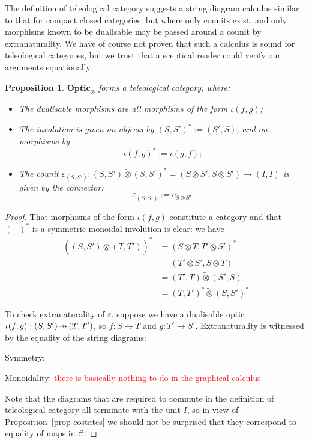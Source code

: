 \documentclass[11pt,a4paper]{article}
\theoremstyle{plain}
\newtheorem{proposition}[theorem]{Proposition}
\theoremstyle{definition}
\newcommand{\C}{\mathscr{C}}
\newcommand{\Optic}{\mathbf{Optic}}
\newcommand{\switched}{\mathbin{\tilde{\otimes}}}
\newcommand{\hto}{\ensuremath{\,\mathaccent\shortmid\rightarrow\,}}
\newcommand{\todo}[1]{\textcolor{red}{\small #1}}
\begin{document}
The definition of teleological category suggests a string diagram calculus similar to that for compact closed categories, but where only counits exist, and only morphisms known to be dualisable may be passed around a counit by extranaturality. We have of course not proven that such a calculus is sound for teleological categories, but we trust that a sceptical reader could verify our arguments equationally.

\begin{proposition}
  $\Optic_\otimes$ forms a teleological category, where:
  \begin{itemize}
  \item The dualisable morphisms are all morphisms of the form $\iota(f, g)$;
  \item The involution is given on objects by ${(S, S')}^* := (S', S)$, and on morphisms by \[\iota{(f, g)}^* := \iota(g, f);\]
  \item The counit $\varepsilon_{(S, S')} : (S, S') \switched {(S, S')}^* = (S \otimes S', S \otimes S') \to (I, I)$ is given by the connector: \[\varepsilon_{(S, S')} := c_{S \otimes S'}.\]
  \end{itemize}
\end{proposition}
\begin{proof}
  That morphisms of the form $\iota(f, g)$ constitute a category and that ${(-)}^*$ is a symmetric monoidal involution is clear: we have
  \begin{align*}
    \left( (S, S') \switched (T, T') \right)^*
    &= \left( S \otimes T, T' \otimes S' \right)^* \\
    &= \left(T' \otimes S', S \otimes T  \right) \\
    &= (T', T) \switched (S', S) \\
    &= (T, T')^* \switched (S, S')^*
  \end{align*}

  To check extranaturality of $\varepsilon$, suppose we have a dualisable optic $\iota(f, g) : (S, S') \hto (T, T')$, so $f : S \to T$ and $g : T' \to S'$. Extranaturality is witnessed by the equality of the string diagrams:
  \begin{center}
    
    \qquad \raisebox{1.5cm}{$=$} \qquad
    
  \end{center}
  Symmetry:
  \begin{center}
    
    \qquad \raisebox{1.5cm}{$=$} \qquad
    
  \end{center}
  Monoidality: \todo{there is basically nothing to do in the graphical calculus}

  Note that the diagrams that are required to commute in the definition of teleological category all terminate with the unit $I$, so in view of Proposition~\ref{prop-costates} we should not be surprised that they correspond to equality of maps in $\C$.
\end{proof}
\end{document}

